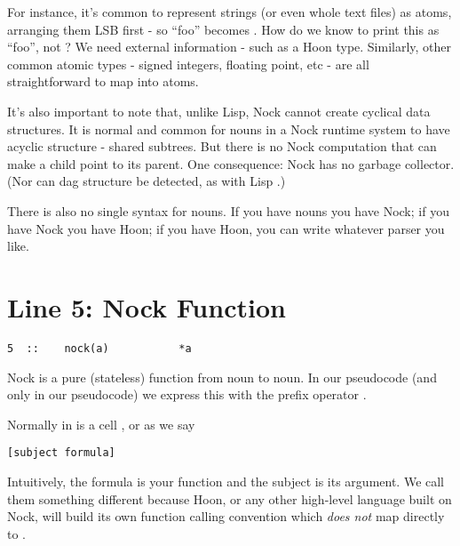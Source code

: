 For instance, it's common to represent strings (or even whole text files) as
atoms, arranging them LSB first - so ``foo'' becomes .  How do we know
to print this as ``foo'', not ?  We need external information - such as
a Hoon type.  Similarly, other common atomic types - signed integers, floating
point, etc
- are all straightforward to map into atoms.

It's also important to note that, unlike Lisp, Nock cannot create cyclical data
structures.  It is normal and common for nouns in a Nock runtime system to have
acyclic structure - shared subtrees.  But there is no Nock computation that can
make a child point to its parent.  One consequence: Nock has no garbage
collector.  (Nor can dag structure be detected, as with Lisp .)

There is also no single syntax for nouns.  If you have nouns you have Nock; if
you have Nock you have Hoon; if you have Hoon, you can write whatever parser
you like.

\section{Line 5: Nock Function}

\begin{framed_shaded}
\begin{Verbatim}[fontsize=\relsize{-2.5},commandchars=\\\{\}]
5  ::    nock(a)           *a
\end{Verbatim}
\end{framed_shaded}
Nock is a pure (stateless) function from noun to noun.  In our pseudocode (and
only in our pseudocode) we express this with the prefix operator \kode{*}.

Normally  in  is a cell \kode{[s f]}, or as we say

\begin{framed_shaded}
\begin{Verbatim}[fontsize=\relsize{-2.5},commandchars=\\\{\}]
[subject formula]
\end{Verbatim}
\end{framed_shaded}
Intuitively, the formula is your function and the subject is its argument.  We
call them something different because Hoon, or any other high-level language
built on Nock, will build its own function calling convention which \emph{does not}
map directly to .

